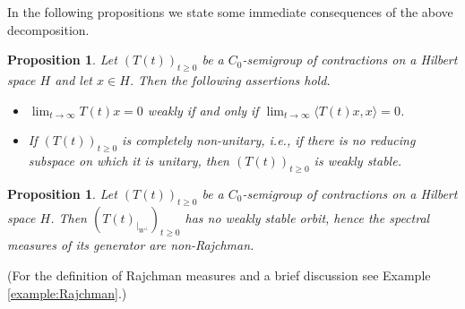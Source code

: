 \documentclass[11pt,intlimits, draft,oneside]{amsart}
\newtheorem{prop}[thm]{Proposition}
\theoremstyle{definition}
\begin{document}
In the following propositions we state some immediate consequences
of the above decomposition.

\begin{prop}
Let $(T(t))_{t\geq0}$ be a $C_0$-semigroup of contractions on a
Hilbert space $H$ and let $x\in H$. Then the following assertions hold.
\begin{itemize}
\item[(i)] $\lim_{t\to\infty}T(t)x= 0$ weakly if and only
if $\lim_{t\to\infty} \langle T(t)x,x \rangle = 0$.
\item[(ii)] If $(T(t))_{t\geq 0}$ is completely non-unitary, i.e., if there is no reducing subspace on which it is unitary, then $(T(t))_{t\geq 0}$ is weakly stable.
\end{itemize}
\end{prop}


\begin{prop}
Let $(T(t))_{t\geq0}$ be a $C_0$-semigroup of contractions on a
Hilbert space $H$. Then $(T(t)_{\mid_{W^{\perp}}})_{t\geq 0}$ has no
weakly stable orbit, hence the spectral measures of its generator
are non-Rajchman.
\end{prop}
\noindent (For the definition of Rajchman measures and a brief
discussion see Example \ref{example:Rajchman}.)
%
\end{document}
